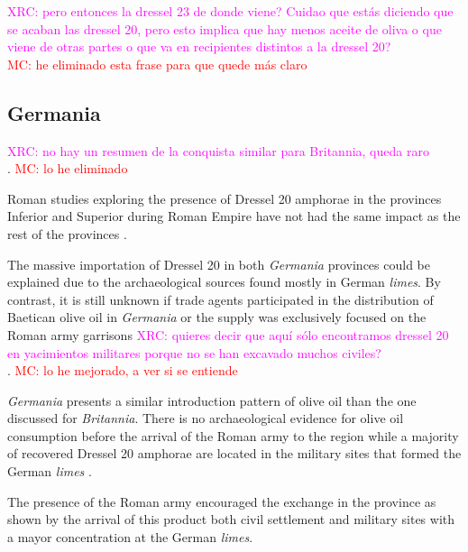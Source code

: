 \documentclass[review]{elsarticle}
\newcommand{\memo}[2]{\textcolor{#1}{#2}}
\newcommand{\maria}[1]{\memo{red}{MC: #1\\}}
\newcommand{\xavi}[1]{\memo{magenta}{XRC: #1\\}}
\begin{document}
\xavi{pero entonces la dressel 23 de donde viene? Cuidao que estás diciendo que se acaban las dressel 20, pero esto implica que hay menos aceite de oliva o que viene de otras partes o que va en recipientes distintos a la dressel 20?}
\maria{he eliminado esta frase para que quede más claro}

\subsection{Germania}

\xavi{no hay un resumen de la conquista similar para Britannia, queda raro}. 
\maria{lo he eliminado}

Roman studies exploring the presence of Dressel 20 amphorae in the provinces Inferior and Superior during Roman Empire have not had the same impact as the rest of the provinces \citep[293]{remesal_baetica_2002}.

The massive importation of Dressel 20 in both \textit{Germania} provinces could be explained due to the archaeological sources found mostly in German \textit{limes}. 
By contrast, it is still unknown if trade agents participated in the distribution of Baetican olive oil in \textit{Germania} or the supply was exclusively focused on the Roman army garrisons\citep[156]{remesal_germn_2010}
\xavi{quieres decir que aquí sólo encontramos dressel 20 en yacimientos militares porque no se han excavado muchos civiles?}.
\maria{lo he mejorado, a ver si se entiende}




\textit{Germania} presents a similar introduction pattern of olive oil than the one discussed for \textit{Britannia}. There is no archaeological evidence for olive oil consumption before the arrival of the Roman army to the region while a majority of recovered Dressel 20 amphorae are located in the military sites that formed the German \textit{limes} \citep{remesal_germaniaengl_2002}.


The presence of the Roman army encouraged the exchange in the province as shown by the arrival of this product both civil settlement and military sites with a mayor concentration at the German \textit{limes}.
\end{document}
